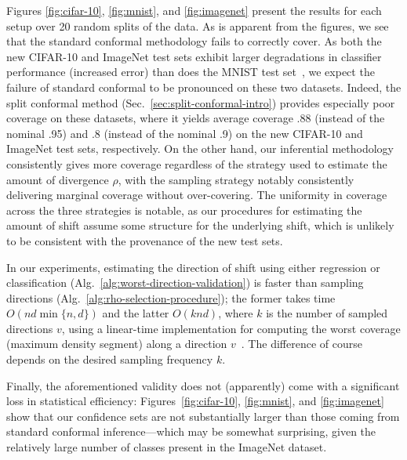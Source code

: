Figures \ref{fig:cifar-10}, \ref{fig:mnist}, and \ref{fig:imagenet} present
the results for each setup over 20 random splits of the data. As is apparent
from the figures, we see that the standard conformal methodology fails to
correctly cover.  As both the new CIFAR-10 and ImageNet test sets exhibit
larger degradations in classifier performance (increased error) than does
the MNIST test set~\cite{RechtRoScSh19}, we expect the failure of standard
conformal to be pronounced on these two datasets.  Indeed, the split
conformal method (Sec.~\ref{sec:split-conformal-intro}) provides especially
poor coverage on these datasets, where it yields average coverage .88
(instead of the nominal .95) and .8 (instead of the nominal .9) on the new
CIFAR-10 and ImageNet test sets, respectively.  On the other hand, our
inferential methodology consistently gives more coverage regardless of the
strategy used to estimate the amount of divergence $\rho$, with the sampling
strategy notably consistently delivering marginal coverage without
over-covering.  The uniformity in coverage across the three strategies is
notable, as our procedures for estimating the amount of shift assume some
structure for the underlying shift, which is unlikely to be consistent with
the provenance of the new test sets.

In our experiments, estimating the direction of shift using either
regression or classification (Alg.~\ref{alg:worst-direction-validation}) is
faster than sampling directions (Alg.~\ref{alg:rho-selection-procedure});
the former takes time $O(nd \min\{n, d\})$ and
the latter $O(k n d)$, where $k$ is the number
of sampled directions $v$, using a linear-time implementation for
computing the worst coverage (maximum density segment) along
a direction $v$~\cite{ChungLu03}.
The difference of course depends on the desired sampling frequency
$k$.


Finally, the aforementioned validity does not (apparently) come
with a significant loss in statistical efficiency:
Figures~\ref{fig:cifar-10}, \ref{fig:mnist}, and \ref{fig:imagenet} show
that our confidence sets are not substantially larger than those coming from
standard conformal inference---which may be somewhat surprising, given the
relatively large number of classes present in the ImageNet dataset.

